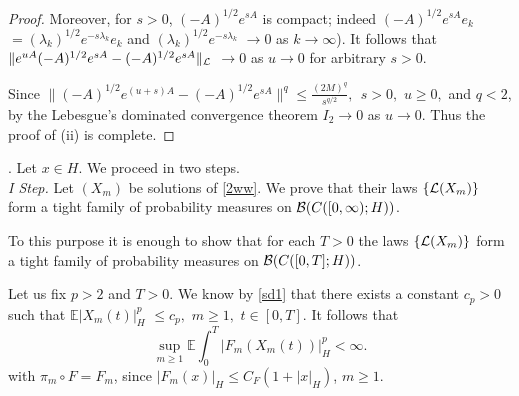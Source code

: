 \documentclass[preprint]{imsart}
\def\E{\mathbb E}
\def\ds{\displaystyle}
\begin{document}
\begin{proof}
     
     Moreover, for $s>0$, $(-A)^{1/2} e^{sA}$ is compact; indeed $(-A)^{1/2} e^{sA} e_k$ $= (\lambda_k)^{1/2} e^{-s \lambda_k} e_k$ and 
     $\displaystyle{(\lambda_k)^{1/2} e^{-s \lambda_k}}$ $ \to 0$ as $k \to \infty$). It follows that  
  $\|e^{uA}(-A)^{1/2}e^{sA}-
(-A)^{1/2}e^{sA}\|_{\cal L}$ $ \rightarrow 0$ as $u\rightarrow 0$  for
arbitrary $s>0$.     


Since
 $
\ds \|(-A)^{1/2} e^{(u+s)A}- (-A)^{1/2} e^{sA}
\|^{q}\leq \frac{ (2M)^q }{s^{q/2}} , \;   \,       s >0,
 $ $ u\geq 0, 
$
 and $q<2$,
 by the Lebesgue's dominated 
convergence theorem $I_{2}\rightarrow 0$ as   
$u\rightarrow 0$. Thus the proof of
(ii) is complete.
 \end{proof}

. Let $x \in H$. We proceed {   in}  two steps. 
\\
{\it I Step.} Let $( X_{m})$ be solutions of \eqref{2ww}.  
 We prove that  their laws $\{ {\cal
L}(X_{m})\}$ form a tight family of 
probability measures on ${\cal B}(C([0,\infty);H))$.

To this purpose it is enough to show that for each $T>0$ the laws $\{ {\cal
L}(X_{m})\}$ form a tight family of 
probability measures on ${\cal B}(C([0,T];H))$.

 Let us fix  $p>2$ and $T>0$.  
   We know by \eqref{sd1}
 that there exists a constant $c_{p}>0$ such that $\E|X_{m}(t)|^{p}_H  $ $\leq c_{p},$ $  m\ge 1,$ $t \in [0,T].$ It follows that
\begin{equation}
\sup_{m \ge 1} \E\int_0^T |F_m(X_{m}(t))|^{p}_H < \infty.
\label{e8.18} 
\end{equation} 
with $\pi_m \circ F = F_m$, since   $|F_m(x)|_H \le C_F (1 + |x|_H)$, $m \ge 1$. 
\end{document}
